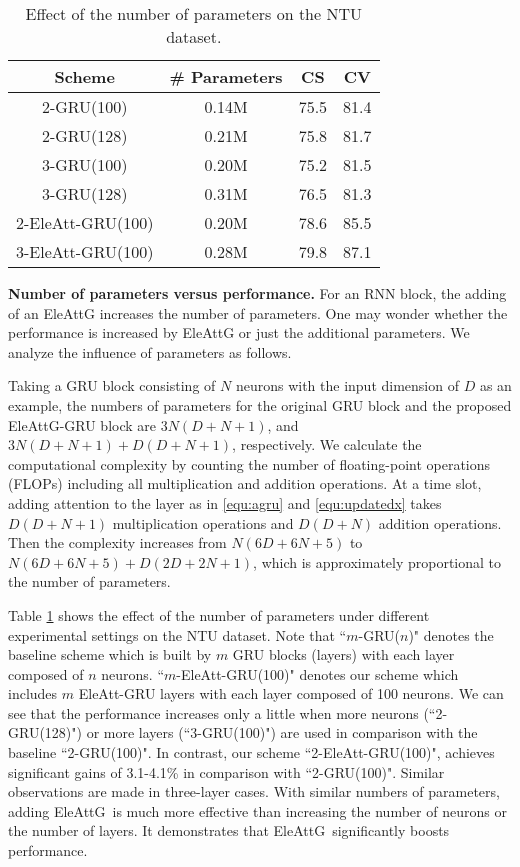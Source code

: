\documentclass[journal]{IEEEtran}
\newcommand{\EleAttGn}{{EleAttG}}
\newcommand{\EleAttG}{{EleAttG~}}
\begin{document}
\setlength{\tabcolsep}{6pt}
\begin{table}[t]
	\centering
	\caption{Effect of the number of parameters  on the NTU dataset.}
	\begin{tabular}{cccc}
		\toprule
		Scheme & \# Parameters & CS    & CV \\
		\midrule
		2-GRU(100) & 0.14M & 75.5  & 81.4  \\
		2-GRU(128) & 0.21M & 75.8 & 81.7 \\
		3-GRU(100) & 0.20M & 75.2  & 81.5  \\
		3-GRU(128) & 0.31M & 76.5  & 81.3  \\
		2-EleAtt-GRU(100) & 0.20M & 78.6  & 85.5 \\
		3-EleAtt-GRU(100) & 0.28M & 79.8  & 87.1  \\
		\bottomrule
	\end{tabular}
	\label{tab:params}
\end{table}

\textbf{Number of parameters versus performance.} For an RNN block, the adding of an EleAttG increases the number of parameters. One may wonder whether the performance is increased by {\EleAttGn} or just the additional parameters. We analyze the influence of parameters as follows.

Taking a GRU block consisting of $N$ neurons with the input dimension of $D$ as an example, the numbers of parameters for the original GRU block and the proposed EleAttG-GRU block are $3N(D+N+1)$, and $3N(D+N+1) +D(D+N+1)$, respectively. We calculate the computational complexity by counting the number of floating-point operations (FLOPs) including all multiplication and addition operations. At a time slot, adding attention to the layer as in \ref{equ:agru} and \ref{equ:updatedx} takes $D(D+N+1)$ multiplication operations and $D(D+N)$ addition operations. Then the complexity increases from $N(6D+6N+5)$ to $N(6D+6N+5)+D(2D+2N+1)$, which is approximately proportional to the number of parameters. 

Table \ref{tab:params} shows the effect of the number of parameters under different experimental settings on the NTU dataset. Note that ``$m$-GRU($n$)" denotes the baseline scheme which is built by $m$ GRU blocks (layers) with each layer composed of $n$ neurons. ``$m$-EleAtt-GRU(100)" denotes our scheme which includes $m$ EleAtt-GRU layers with each layer composed of 100 neurons.  We can see that the performance increases only a little when more neurons (``2-GRU(128)") or more layers (``3-GRU(100)") are used in comparison with the baseline ``2-GRU(100)". In contrast, our scheme ``2-EleAtt-GRU(100)", achieves significant gains of 3.1-4.1\% in comparison with ``2-GRU(100)". Similar observations are made in three-layer cases. With similar numbers of parameters, adding \EleAttG is much more effective than increasing the number of neurons or the number of layers. It demonstrates that \EleAttG significantly boosts performance.
\end{document}
